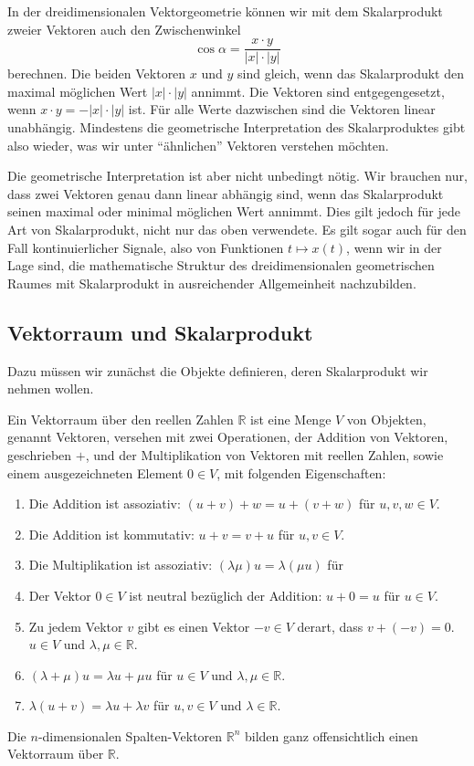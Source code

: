 In der dreidimensionalen Vektorgeometrie können wir mit dem Skalarprodukt
zweier Vektoren auch den Zwischenwinkel
\[
\cos\alpha
=
\frac{
x\cdot y
}{
|x|\cdot |y|
}
\]
berechnen.
Die beiden Vektoren $x$ und $y$ sind gleich, wenn das Skalarprodukt
den maximal möglichen Wert $|x|\cdot |y|$ annimmt.
Die Vektoren sind entgegengesetzt, wenn $x\cdot y=-|x|\cdot |y|$ ist.
Für alle Werte dazwischen sind die Vektoren linear unabhängig.
Mindestens die geometrische Interpretation des Skalarproduktes gibt also
wieder, was wir unter ``ähnlichen'' Vektoren verstehen möchten.

Die geometrische Interpretation ist aber nicht unbedingt nötig.
Wir brauchen nur, dass zwei Vektoren genau dann linear abhängig sind,
wenn das Skalarprodukt seinen maximal oder minimal möglichen Wert annimmt.
Dies gilt jedoch für jede Art von Skalarprodukt, nicht nur das oben
verwendete.
Es gilt sogar auch für den Fall kontinuierlicher Signale, also von
Funktionen $t\mapsto x(t)$, wenn wir in der Lage sind, die mathematische
Struktur des dreidimensionalen geometrischen Raumes mit Skalarprodukt
in ausreichender Allgemeinheit nachzubilden.

\subsection{Vektorraum und Skalarprodukt}
Dazu müssen wir zunächst die Objekte definieren, deren Skalarprodukt wir
nehmen wollen.
\begin{definition}
Ein Vektorraum über den reellen Zahlen $\mathbb R$ ist eine Menge $V$ 
von Objekten, genannt Vektoren, versehen mit zwei Operationen, der
Addition von Vektoren, geschrieben $+$, und der Multiplikation von Vektoren
mit reellen Zahlen, sowie einem ausgezeichneten Element $0\in V$, mit
folgenden Eigenschaften:
\begin{enumerate}
\item Die Addition ist assoziativ: $(u+v)+w = u+(v+w)$ für $u,v,w\in V$.
\item Die Addition ist kommutativ: $u+v=v+u$ für $u,v\in V$.
\item Die Multiplikation ist assoziativ: $(\lambda \mu)u=\lambda (\mu u)$ für
\item Der Vektor $0\in V$ ist neutral bezüglich der Addition: $u+0=u$ für
$u\in V$.
\item Zu jedem Vektor $v$ gibt es einen Vektor $-v\in V$ derart, dass
$v+(-v)=0$.
$u\in V$ und $\lambda,\mu\in\mathbb R$.
\item $(\lambda + \mu) u = \lambda u + \mu u$ für $u\in V$ und
$\lambda,\mu\in \mathbb R$.
\item $\lambda (u + v) = \lambda u + \lambda v$ für $u,v\in V$ und
$\lambda\in\mathbb R$.
\end{enumerate}
\end{definition}
Die $n$-dimensionalen Spalten-Vektoren $\mathbb R^n$ bilden ganz offensichtlich
einen Vektorraum über $\mathbb R$.


